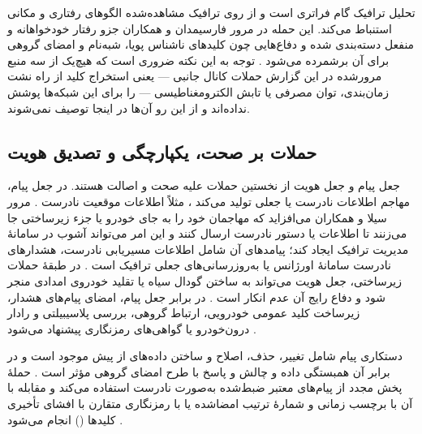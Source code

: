 تحلیل ترافیک  گام فراتری است و از روی ترافیک مشاهده‌شده الگوهای رفتاری و مکانی استنباط می‌کند. این حمله در مرور فارسیمدان و همکاران جزو رفتار خودخواهانه و منفعل دسته‌بندی شده و دفاع‌هایی چون کلیدهای ناشناس پویا، شبه‌نام و امضای گروهی برای آن برشمرده می‌شود \cite{farsimadanReviewSecurityChallenges2025}. توجه به این نکته ضروری است که هیچ‌یک از سه منبع مرورشده در این گزارش حملات کانال جانبی  — یعنی استخراج کلید از راه نشت زمان‌بندی، توان مصرفی یا تابش الکترومغناطیسی — را برای این شبکه‌ها پوشش نداده‌اند و از این رو آن‌ها در اینجا توصیف نمی‌شوند.

\subsection{حملات بر صحت، یکپارچگی و تصدیق هویت}

جعل پیام  و جعل هویت  از نخستین حملات علیه صحت و اصالت هستند. در جعل پیام، مهاجم اطلاعات نادرست یا جعلی تولید می‌کند \cite{farsimadanReviewSecurityChallenges2025}، مثلاً اطلاعات موقعیت نادرست \cite{farsimadanReviewSecurityChallenges2025}. مرور سیلا و همکاران می‌افزاید که مهاجمان خود را به جای خودرو یا جزء زیرساختی جا می‌زنند تا اطلاعات یا دستور نادرست ارسال کنند و این امر می‌تواند آشوب در سامانهٔ مدیریت ترافیک ایجاد کند؛ پیامدهای آن شامل اطلاعات مسیریابی نادرست، هشدارهای نادرست سامانهٔ اورژانس یا به‌روزرسانی‌های جعلی ترافیک است \cite{VanetSecurityPrivacy}. در طبقهٔ حملات زیرساختی، جعل هویت می‌تواند به ساختن گودال سیاه یا تقلید خودروی امدادی منجر شود و دفاع رایج آن عدم انکار است \cite{farsimadanReviewSecurityChallenges2025}. در برابر جعل پیام، امضای پیام‌های هشدار، زیرساخت کلید عمومی خودرویی، ارتباط گروهی، بررسی پلاسیبیلتی و رادار درون‌خودرو یا گواهی‌های رمزنگاری پیشنهاد می‌شود \cite{farsimadanReviewSecurityChallenges2025}.

دستکاری پیام  شامل تغییر، حذف، اصلاح و ساختن داده‌های از پیش موجود است \cite{farsimadanReviewSecurityChallenges2025} و در برابر آن همبستگی داده و چالش و پاسخ با طرح امضای گروهی مؤثر است \cite{farsimadanReviewSecurityChallenges2025}. حملهٔ پخش مجدد  از پیام‌های معتبر ضبط‌شده به‌صورت نادرست استفاده می‌کند و مقابله با آن با برچسب زمانی و شمارهٔ ترتیب امضاشده \cite{farsimadanReviewSecurityChallenges2025} یا با رمزنگاری متقارن با افشای تأخیری کلیدها () انجام می‌شود \cite{farsimadanReviewSecurityChallenges2025}.

